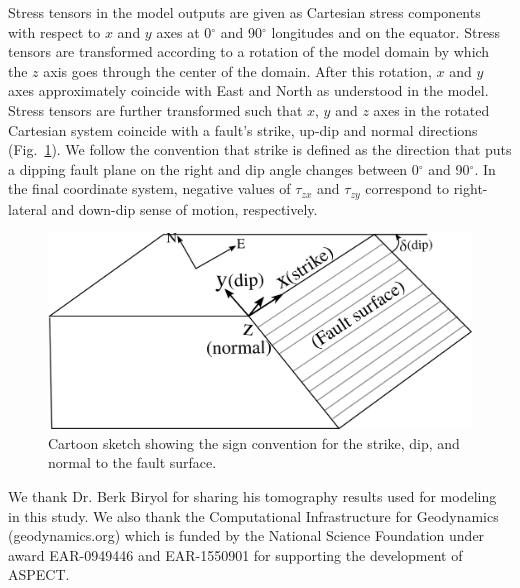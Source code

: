 \documentclass[draft,linenumbers]{agujournal2018}
\begin{document}
Stress tensors in the model outputs are given as Cartesian stress components with respect to $x$ and $y$ axes at 0$^{\circ}$ and 90$^{\circ}$ longitudes and on the equator. Stress tensors are transformed according to a rotation of the model domain by which the $z$ axis goes through the center of the domain. After this rotation, $x$ and $y$ axes approximately coincide with East and North as understood in the model. Stress tensors are further transformed such that $x$, $y$ and $z$ axes in the rotated Cartesian system coincide with a fault\rq{}s strike, up-dip and normal directions (Fig.~\ref{signs}). We follow the convention that strike is defined as the direction that puts a dipping fault plane on the right and dip angle changes between 0$^{\circ}$ and 90$^{\circ}$. %
In the final coordinate system, negative values of $\tau_{zx}$ and $\tau_{zy}$ correspond to right-lateral and down-dip sense of motion, respectively.
%
\begin{figure}[h!]
    \centering
    \includegraphics[width=0.5\linewidth]{figures/sign_convention.png}
    \caption{Cartoon sketch showing the sign convention for the strike, dip, and normal to the fault surface. }
    \label{signs}
\end{figure}


\acknowledgments
We thank Dr. Berk Biryol for sharing his tomography results used for modeling in this study. We also thank the Computational Infrastructure for Geodynamics (geodynamics.org) which is funded by the National Science Foundation under award EAR-0949446 and EAR-1550901 for supporting the development of ASPECT.


\end{document}
